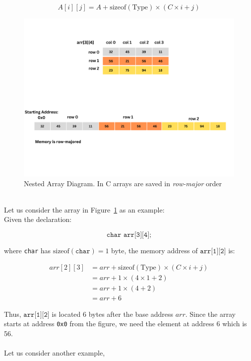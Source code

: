 \documentclass{article}
\begin{document}
\begin{equation}
A[i][j] = A + \text{sizeof}(\text{Type}) \times (C \times i + j)
\end{equation}

 \begin{figure}[t]
    \centering
    \includegraphics[width=\textwidth]{images/nested_arrays.pdf}
    \caption{Nested Array Diagram. In C arrays are saved in \textit{row-major} order}
    \label{fig:nested_array}
\end{figure}
\\
\noindent Let us consider the array in Figure~\ref{fig:nested_array} as an example: \\
Given the declaration:

\[
\texttt{char arr[3][4];}
\]

where \texttt{char} has \(\text{sizeof}(\texttt{char}) = 1\) byte, the memory address of \(\texttt{arr[1][2]}\) is:

\begin{align*}
arr[2][3] &= arr + \text{sizeof}(\text{Type}) \times (C \times i + j) \\
        &= arr + 1 \times (4 \times 1 + 2) \\
        &= arr + 1 \times (4 + 2) \\
        &= arr + 6
\end{align*}

Thus, \(\texttt{arr[1][2]}\) is located 6 bytes after the base address \( arr \).
Since the array starts at address \texttt{0x0} from the figure, we need the element at address 6 which is 56. \\
\\
\noindent Let us consider another example, \\
\end{document}
